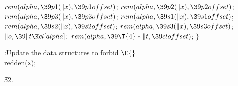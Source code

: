 ${}\\{rem}(\\{alpha},\39\\{p1}(\|x),\39\\{p1offset}){}$;\6
${}\\{rem}(\\{alpha},\39\\{p2}(\|x),\39\\{p2offset}){}$;\6
${}\\{rem}(\\{alpha},\39\\{p3}(\|x),\39\\{p3offset}){}$;\6
${}\\{rem}(\\{alpha},\39\\{s1}(\|x),\39\\{s1offset}){}$;\6
${}\\{rem}(\\{alpha},\39\\{s2}(\|x),\39\\{s2offset}){}$;\6
${}\\{rem}(\\{alpha},\39\\{s3}(\|x),\39\\{s3offset}){}$;\6
${}\|o,\39\|t\K\\{cl}[\\{alpha}];{}$\6
${}\\{rem}(\\{alpha},\39\T{4}*\|t,\39\\{cloffset}){}$;\6
\4${}\}{}$\2\par
\fi

\B{}:Update the data structures to forbid \X${}\E{}$\6
\\{redden}(\|x);\par
\U32.\fi

